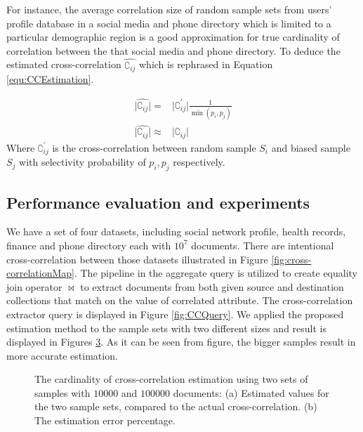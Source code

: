 For instance, the average correlation size of random sample sets from users' profile database in a social media and phone directory which is limited to a particular demographic region is a good approximation for true cardinality of correlation between the that social media and phone directory. To deduce the estimated cross-correlation $\hat{\complement_{ij}}$ which is rephrased in Equation \ref{equ:CCEstimation}.

\begin{equation} 
\label{equ:CCEstimation}
\begin{aligned}
\vert \hat{\complement_{ij}}\vert=& \vert \complement^{\prime}_{ij}\vert \frac{1}{\min(p_i,p_j)}\\
\vert \hat{\complement_{ij}}\vert \approx & \vert \complement_{ij}\vert
\end{aligned}
\end{equation}
Where $\complement^{\prime}_{ij}$ is the cross-correlation between random sample $S_i$ and biased sample $S_j$ with selectivity probability of $p_i, p_j$ respectively.

\subsection{Performance evaluation and experiments}
\label{PerformanceSubSection}
We have a set of four datasets, including social network profile, health records, finance and phone directory each with $10^7$ documents. There are intentional cross-correlation between those datasets illustrated in Figure \ref{fig:cross-correlationMap}. The pipeline in the aggregate query is utilized to create equality join operator $\bowtie$ to extract documents from both given source and destination collections that match on the value of correlated attribute. The cross-correlation extractor query is displayed in Figure \ref{fig:CCQuery}. We applied the proposed estimation method to the sample sets with two different sizes and result is displayed in Figures \ref{fig:CCAproximation}. As it can be seen from figure, the bigger samples result in more accurate estimation. 




\begin{figure}[H]
\begin{subfigure}{0.5\textwidth}
\centering
\resizebox{1.0\textwidth}{!}{}
\label{fig:CCEstimation}
\caption{}
\end{subfigure}
\qquad 
\begin{subfigure}{0.5\textwidth}
\resizebox{1.0\textwidth}{!}{}
\label{fig:errorPercentage}
\caption{}
\end{subfigure}
\caption{The cardinality of cross-correlation estimation using two sets of samples with $10000$ and $100000$ documents: (a) Estimated values for the two sample sets, compared to the actual cross-correlation. (b) The estimation error percentage.}
\label{fig:CCAproximation}
\end{figure}